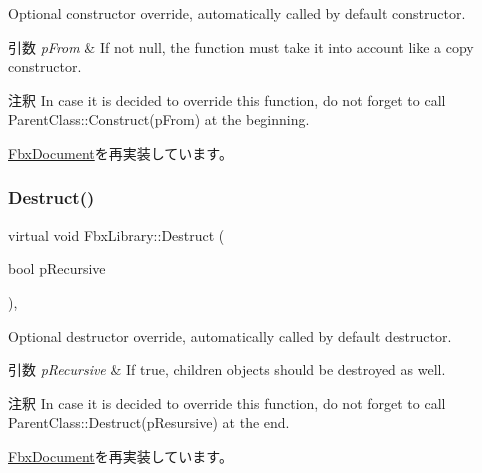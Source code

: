Optional constructor override, automatically called by default constructor. 
\begin{DoxyParams}{引数}
{\em p\+From} & If not null, the function must take it into account like a copy constructor. \\
\hline
\end{DoxyParams}
\begin{DoxyRemark}{注釈}
In case it is decided to override this function, do not forget to call Parent\+Class\+::\+Construct(p\+From) at the beginning. 
\end{DoxyRemark}


\hyperlink{class_fbx_document_a9bc37787619a99fca90b839c16e4f2b8}{Fbx\+Document}を再実装しています。

\mbox{\label{class_fbx_library_ad763dd7c511f4c97d1163545de1bbbe9}} 
\subsubsection{\texorpdfstring{Destruct()}{Destruct()}}
{\footnotesize\ttfamily virtual void Fbx\+Library\+::\+Destruct (\begin{DoxyParamCaption}\item[{bool}]{p\+Recursive }\end{DoxyParamCaption})\hspace{0.3cm}{\ttfamily [protected]}, {\ttfamily [virtual]}}

Optional destructor override, automatically called by default destructor. 
\begin{DoxyParams}{引数}
{\em p\+Recursive} & If true, children objects should be destroyed as well. \\
\hline
\end{DoxyParams}
\begin{DoxyRemark}{注釈}
In case it is decided to override this function, do not forget to call Parent\+Class\+::\+Destruct(p\+Resursive) at the end. 
\end{DoxyRemark}


\hyperlink{class_fbx_document_a172d19ae540cbd086ade62adaf1a54b8}{Fbx\+Document}を再実装しています。

\mbox{\label{class_fbx_library_a562702d3ba172e178bf0d63ba5b9974b}} 
